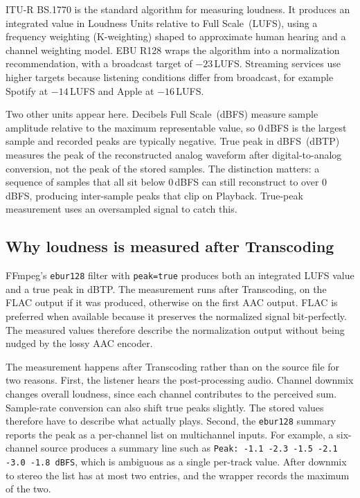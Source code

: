 \documentclass[a4paper,11pt]{article}
\begin{document}
ITU-R BS.1770 is the standard algorithm for measuring loudness. It
produces an integrated value in Loudness Units relative to Full
Scale~(LUFS), using a frequency weighting (K-weighting) shaped to
approximate human hearing and a channel weighting model. EBU R128
wraps the algorithm into a normalization recommendation, with a
broadcast target of \(-23\)\,LUFS. Streaming services use higher
targets because listening conditions differ from broadcast, for
example Spotify at \(-14\)\,LUFS and Apple at \(-16\)\,LUFS.

Two other units appear here. Decibels Full Scale~(dBFS) measure sample
amplitude relative to the maximum representable value, so 0\,dBFS is
the largest sample and recorded peaks are typically negative. True
peak in dBFS~(dBTP) measures the peak of the reconstructed analog
waveform after digital-to-analog conversion, not the peak of the
stored samples. The distinction matters: a sequence of samples that
all sit below 0\,dBFS can still reconstruct to over 0\,dBFS, producing
inter-sample peaks that clip on Playback. True-peak measurement uses
an oversampled signal to catch this.

\subsection{Why loudness is measured after Transcoding}
FFmpeg's \texttt{ebur128} filter with \texttt{peak=true} produces both
an integrated LUFS value and a true peak in dBTP. The measurement
runs after Transcoding, on the FLAC output if it was produced,
otherwise on the first AAC output. FLAC is preferred when available
because it preserves the normalized signal bit-perfectly. The measured
values therefore describe the normalization output without being
nudged by the lossy AAC encoder.

The measurement happens after Transcoding rather than on the source
file for two reasons. First, the listener hears the post-processing
audio. Channel downmix changes overall loudness, since each channel
contributes to the perceived sum. Sample-rate conversion can also
shift true peaks slightly. The stored values therefore have to
describe what actually plays. Second, the \texttt{ebur128} summary
reports the peak as a per-channel list on multichannel inputs. For
example, a six-channel source produces a summary line such as
\texttt{Peak: -1.1 -2.3 -1.5 -2.1 -3.0 -1.8 dBFS}, which is ambiguous
as a single per-track value. After downmix to stereo the list has at
most two entries, and the wrapper records the maximum of the two.
\end{document}
